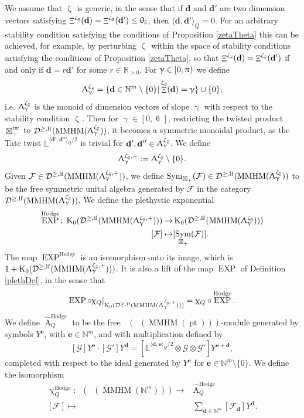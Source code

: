 \documentclass[a4paper,10pt]{amsart}
\newcommand{\dd}{\mathbf{d}}
\newcommand{\ee}{\mathbf{e}}
\newcommand{\LL}{\mathbb{L}}
\renewcommand{\theta}{\uptheta}
\renewcommand{\gamma}{\upgamma}
\renewcommand{\zeta}{\upzeta}
\renewcommand{\pi}{\uppi\hspace{0.05em}}
\renewcommand{\chi}{\upchi}
\renewcommand{\Lambda}{\Uplambda}
\DeclareMathOperator{\KK}{K_0}
\DeclareMathOperator{\tw}{tw}
\DeclareMathOperator{\Ror}{A}
\DeclareMathOperator{\Hodge}{Hodge}
\DeclareMathOperator{\Mu}{\Upxi}
\DeclareMathOperator{\MMHM}{MMHM}
\DeclareMathOperator{\Sym}{Sym}
\DeclareMathOperator{\pt}{pt}
\DeclareMathOperator{\EXP}{EXP}
\DeclareMathOperator{\Ss}{\overline{s}}
\DeclareMathOperator{\Dulf}{\mathcal{D}^{\geq, lf}}
\begin{document}
We assume that $\zeta_{\Ss}$ is generic, in the sense that if $\dd$ and $\dd'$ are two dimension vectors satisfying $\Mu^{\zeta_{\Ss}}(\dd)=\Mu^{\zeta_{\Ss}}(\dd')\leq \theta_{\Ss}$, then $\langle \dd,\dd'\rangle_Q=0$.  For an arbitrary stability condition satisfying the conditions of Proposition \ref{zetaTheta} this can be achieved, for example, by perturbing $\zeta_{\Ss}$ within the space of stability conditions satisfying the conditions of Proposition \ref{zetaTheta}, so that $\Mu^{\zeta_{\Ss}}(\dd)=\Mu^{\zeta_{\Ss}}(\dd')$ if and only if $\dd=r\dd'$ for some $r\in\mathbb{R}_{>0}$.  For $\gamma\in [0,\pi)$ we define
\[
\Lambda_{\gamma}^{\zeta_{\Ss}}=\{\dd\in \mathbb{N}^m\setminus\{0\}|\Mu^{\zeta_{\Ss}}(\dd)=\gamma\}\cup \{0\},
\]
i.e. $\Lambda_{\gamma}^{\zeta_{\Ss}}$ is the monoid of dimension vectors of slope $\gamma$ with respect to the stability condition $\zeta_{\Ss}$.  Then for $\gamma\in [0,\theta_{\Ss}]$, restricting the twisted product $\boxtimes_+^{\tw}$ to $\Dulf(\MMHM(\Lambda_{\gamma}^{\zeta_{\Ss}}))$, it becomes a symmetric monoidal product, as the Tate twist $\LL^{\langle \dd',\dd''\rangle_Q/2}$ is trivial for $\dd',\dd''\in\Lambda_{\gamma}^{\zeta_{\Ss}}$.  We define
\[
\Lambda^{\zeta_{\Ss},+}_{\gamma}:=\Lambda_{\gamma}^{\zeta_{\Ss}}\setminus \{0\}.
\]
Given $\mathcal{F}\in\Dulf(\MMHM(\Lambda^{\zeta_{\Ss},+}_{\gamma}))$, we define $\Sym_{\boxtimes_+}(\mathcal{F})\in\Dulf(\MMHM(\Lambda^{\zeta_{\Ss}}_{\gamma}))$ to be the free symmetric unital algebra generated by $\mathcal{F}$ in the category $\Dulf(\MMHM(\Lambda_{\gamma}^{\zeta_{\Ss}}))$.  We define the plethystic exponential
\begin{align*}
\EXP^{\Hodge}\colon\KK(\Dulf(\MMHM(\Lambda_{\gamma}^{\zeta_{\Ss},+})))\rightarrow &\KK(\Dulf(\MMHM(\Lambda_{\gamma}^{\zeta_{\Ss}})))\\
[\mathcal{F}]\mapsto &[\Sym_{\boxtimes_+}(\mathcal{F})].
\end{align*}
The map $\EXP^{\Hodge}$ is an isomorphism onto its image, which is $1+\KK(\Dulf(\MMHM(\Lambda_{\gamma}^{\zeta_{\Ss},+})))$.  It is also a lift of the map $\EXP$ of Definition \ref{plethDef}, in the sense that 
\[
\EXP\circ\chi_Q|_{\KK(\Dulf(\MMHM(\Lambda_{\gamma}^{\zeta_{\Ss},+})))}=\chi_Q\circ\EXP^{\Hodge}.  
\]
We define $\hat{\Ror}^{\Hodge}_Q$ to be the free $\KK(\Dulf(\MMHM(\pt)))$-module generated by symbols $Y^{\ee}$, with $\ee\in\mathbb{N}^m$, and with multiplication defined by 
\[
[\mathcal{G}]Y^{\ee}\cdot [\mathcal{G}']Y^{\dd}=[\LL^{\langle \dd,\ee\rangle_Q/2}\otimes \mathcal{G}\otimes\mathcal{G}']Y^{\ee+\dd},
\]
completed with respect to the ideal generated by $Y^{\ee}$ for $\ee\in\mathbb{N}^m\setminus \{0\}$.  We define the isomorphism
\begin{align*}
\chi^{\Hodge}_Q:\KK\left(\Dulf(\MMHM(\mathbb{N}^m))\right)\rightarrow&\hat{\Ror}^{\Hodge}_Q\\
[\mathcal{F}]\mapsto&\sum_{\dd\in\mathbb{N}^m}[\mathcal{F}_{\dd}]Y^{\dd}.
\end{align*}
\end{document}
